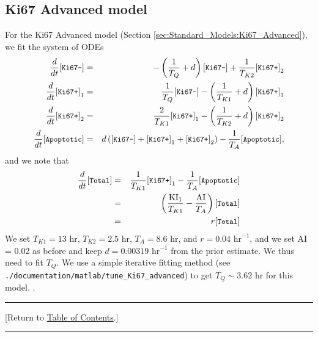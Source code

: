 \documentclass[12pt]{article}
\newcommand{\beqa}{\begin{eqnarray}}
\newcommand{\eeqa}{\end{eqnarray}}
\renewcommand{\v}{\verb}
\renewcommand{\tt}[1]{{\small \left[\texttt{#1}\right] }}
\newcommand{\TOClink}{\begin{center}\hrule\vskip-5pt\phantom{.}\hfill[Return to \hyperlink{TOC}{Table of Contents}.]\hfill\phantom{.}\vskip3pt\hrule\end{center}}
\begin{document}
\subsection{Ki67 Advanced model}
\label{sec:parameters:Ki67_advanced}
For the Ki67 Advanced model (Section \ref{sec:Standard_Models:Ki67_Advanced}), 
we fit the system of ODEs 
\beqa
\frac{d}{dt}\tt{Ki67-} & = & -\left( \frac{1}{T_Q} + d \right) \tt{Ki67-} + \frac{1}{T_{K2}}\tt{Ki67+}_2  \\
\frac{d}{dt}\tt{Ki67+}_1 & = & \frac{1}{T_Q} \tt{Ki67-} - \left( \frac{1}{T_{K1}} + d \right) \tt{Ki67+}_1 \\
\frac{d}{dt}\tt{Ki67+}_2 & = &  \frac{2}{T_{K1}} \tt{Ki67+}_1 - \left( \frac{1}{T_{K2}} + d \right) \tt{Ki67+}_2 \\
\frac{d}{dt}\tt{Apoptotic} & = & d\left( \tt{Ki67-} + \tt{Ki67+}_1 + \tt{Ki67+}_2 \right) -\frac{1}{T_A} \tt{Apoptotic}, 
\eeqa
and we note that 
\beqa
\frac{d}{dt}\tt{Total} 
& = & \frac{1}{T_{K1}} \tt{Ki67+}_1 - \frac{1}{T_A} \tt{Apoptotic} \nonumber \\ 
& = & \left( \frac{\textrm{KI}_1}{T_{K1}} - \frac{\textrm{AI}}{T_A} \right) \tt{Total} \nonumber \\ 
& = & r \tt{Total} 
\eeqa
We set $T_{K1} = 13$ hr, $T_{K2} = 2.5$ hr, $T_A = 8.6$ hr, and 
$r = 0.04 \textrm{ hr}^{-1}$, and we set AI = 0.02 as before and keep 
$d = 0.00319 \textrm{ hr}^{-1}$ from the prior estimate. We thus need to fit  
$T_Q$. We use a simple iterative fitting method 
(see \v|./documentation/matlab/tune_Ki67_advanced|) to get $T_Q \sim 3.62 \textrm{ hr}$ for this model. 
\cite{ref:Ki67_MCF10A}. 

\TOClink 
\end{document}

